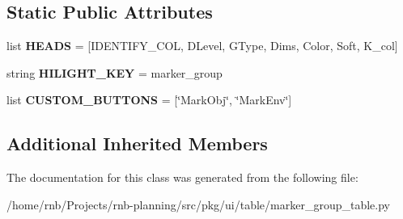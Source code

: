 \subsection*{Static Public Attributes}
\begin{DoxyCompactItemize}
\item 
\mbox{\label{classrnb-planning_1_1src_1_1pkg_1_1ui_1_1table_1_1marker__group__table_1_1_marker_group_table_ad9da762f213719a75c2d003763e4ad08}} 
list {\bfseries H\+E\+A\+DS} = \mbox{[}I\+D\+E\+N\+T\+I\+F\+Y\+\_\+\+C\+OL, \textquotesingle{}D\+Level\textquotesingle{}, \textquotesingle{}G\+Type\textquotesingle{}, \textquotesingle{}Dims\textquotesingle{}, \textquotesingle{}Color\textquotesingle{}, \textquotesingle{}Soft\textquotesingle{}, \textquotesingle{}K\+\_\+col\textquotesingle{}\mbox{]}
\item 
\mbox{\label{classrnb-planning_1_1src_1_1pkg_1_1ui_1_1table_1_1marker__group__table_1_1_marker_group_table_a3e2a039d357d639ca4062f372448d38a}} 
string {\bfseries H\+I\+L\+I\+G\+H\+T\+\_\+\+K\+EY} = \textquotesingle{}marker\+\_\+group\textquotesingle{}
\item 
\mbox{\label{classrnb-planning_1_1src_1_1pkg_1_1ui_1_1table_1_1marker__group__table_1_1_marker_group_table_a952c6afa1ef19f974531cbdb734428da}} 
list {\bfseries C\+U\+S\+T\+O\+M\+\_\+\+B\+U\+T\+T\+O\+NS} = \mbox{[}\char`\"{}Mark\+Obj\char`\"{}, \char`\"{}Mark\+Env\char`\"{}\mbox{]}
\end{DoxyCompactItemize}
\subsection*{Additional Inherited Members}


The documentation for this class was generated from the following file\+:\begin{DoxyCompactItemize}
\item 
/home/rnb/\+Projects/rnb-\/planning/src/pkg/ui/table/marker\+\_\+group\+\_\+table.\+py\end{DoxyCompactItemize}
